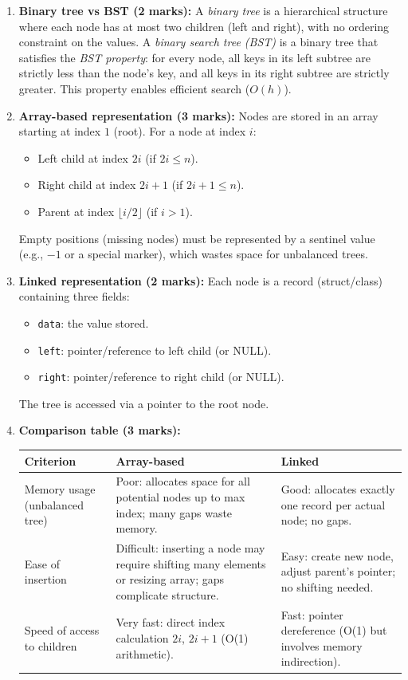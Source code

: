 \documentclass[11pt]{article}
\begin{document}
\begin{corrige}
\begin{enumerate}
\item \textbf{Binary tree vs BST (2 marks):} A \emph{binary tree} is a hierarchical structure where each node has at most two children (left and right), with no ordering constraint on the values. A \emph{binary search tree (BST)} is a binary tree that satisfies the \emph{BST property}: for every node, all keys in its left subtree are strictly less than the node's key, and all keys in its right subtree are strictly greater. This property enables efficient search ($O(h)$).

\item \textbf{Array-based representation (3 marks):} Nodes are stored in an array starting at index $1$ (root). For a node at index $i$:
\begin{itemize}
\item Left child at index $2i$ (if $2i \le n$).
\item Right child at index $2i+1$ (if $2i+1 \le n$).
\item Parent at index $\lfloor i/2 \rfloor$ (if $i > 1$).
\end{itemize}
Empty positions (missing nodes) must be represented by a sentinel value (e.g., $-1$ or a special marker), which wastes space for unbalanced trees.

\item \textbf{Linked representation (2 marks):} Each node is a record (struct/class) containing three fields:
\begin{itemize}
\item \texttt{data}: the value stored.
\item \texttt{left}: pointer/reference to left child (or NULL).
\item \texttt{right}: pointer/reference to right child (or NULL).
\end{itemize}
The tree is accessed via a pointer to the root node.

\item \textbf{Comparison table (3 marks):}
\begin{center}
\begin{tabularx}{\linewidth}{|l|X|X|}\hline
\rowcolor{popblueL}
\textbf{Criterion} & \textbf{Array-based} & \textbf{Linked} \\ \hline
Memory usage (unbalanced tree) & Poor: allocates space for all potential nodes up to max index; many gaps waste memory. & Good: allocates exactly one record per actual node; no gaps. \\ \hline
Ease of insertion & Difficult: inserting a node may require shifting many elements or resizing array; gaps complicate structure. & Easy: create new node, adjust parent's pointer; no shifting needed. \\ \hline
Speed of access to children & Very fast: direct index calculation $2i$, $2i+1$ (O(1) arithmetic). & Fast: pointer dereference (O(1) but involves memory indirection). \\ \hline
\end{tabularx}
\end{center}


\end{enumerate}
\end{corrige}
\end{document}
